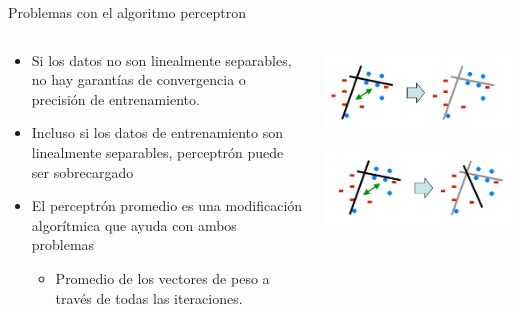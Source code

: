 \documentclass[11pt]{beamer}
\begin{document}
\begin{frame}{Problemas con el algoritmo  perceptron}
\begin{columns}
	\begin{column}{0.55\textwidth}
\begin{itemize}
\item \small {Si los datos no son linealmente separables, no hay garant\'ias de convergencia o precisi\'on de entrenamiento.}

\item \small {Incluso si los datos de entrenamiento son linealmente separables, perceptr\'on puede ser sobrecargado}

\item \small {El perceptr\'on promedio es una modificaci\'on algor\'itmica que ayuda con ambos problemas}
\begin{itemize}
	\item \scriptsize{Promedio de los vectores de peso a trav\'es de todas las iteraciones.}
\end{itemize}
\end{itemize}
	
	\end{column}
	\begin{column}{0.45\textwidth}  
		\includegraphics[scale= 0.32]{TA6.png}
		
	\vspace{0.8cm}
	
		
	\includegraphics[scale= 0.32]{TA7.png}
	\end{column}
\end{columns}
\end{frame}
\end{document}
